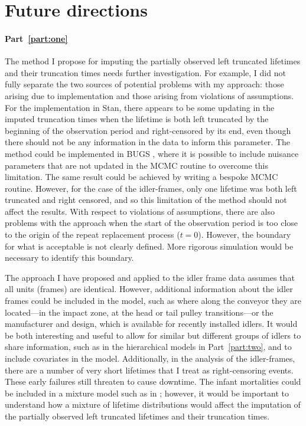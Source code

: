 \section{Future directions} \label{sec:thesis-future-work}

\paragraph*{Part~\ref{part:one}} The method I propose for imputing the partially observed left truncated lifetimes and their truncation times needs further investigation. For example, I did not fully separate the two sources of potential problems with my approach: those arising due to implementation and those arising from violations of assumptions. For the implementation in Stan, there appears to be some updating in the imputed truncation times when the lifetime is both left truncated by the beginning of the observation period and right-censored by its end, even though there should not be any information in the data to inform this parameter. The method could be implemented in BUGS \citep{lunn2012}, where it is possible to include nuisance parameters that are not updated in the MCMC routine to overcome this limitation. The same result could be achieved by writing a bespoke MCMC routine. However, for the case of the idler-frames, only one lifetime was both left truncated and right censored, and so this limitation of the method should not affect the results. With respect to violations of assumptions, there are also problems with the approach when the start of the observation period is too close to the origin of the repeat replacement process ($t = 0$). However, the boundary for what is acceptable is not clearly defined. More rigorous simulation would be necessary to identify this boundary.

The approach I have proposed and applied to the idler frame data assumes that all units (frames) are identical. However, additional information about the idler frames could be included in the model, such as where along the conveyor they are located---in the impact zone, at the head or tail pulley transitions---or the manufacturer and design, which is available for recently installed idlers. It would be both interesting and useful to allow for similar but different groups of idlers to share information, such as in the hierarchical models in Part~\ref{part:two}, and to include covariates in the model. Additionally, in the analysis of the idler-frames, there are a number of very short lifetimes that I treat as right-censoring events. These early failures still threaten to cause downtime. The infant mortalities could be included in a mixture model such as in \citet{mittman2013}; however, it would be important to understand how a mixture of lifetime distributions would affect the imputation of the partially observed left truncated lifetimes and their truncation times.

